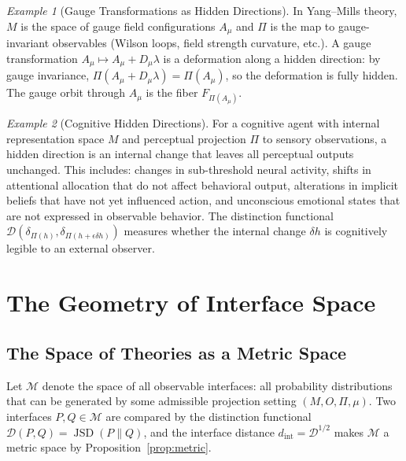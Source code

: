 \documentclass[12pt,a4paper]{article}
\theoremstyle{remark}
\newtheorem{example}{Example}[section]
\theoremstyle{definition}
\begin{document}
\begin{example}[Gauge Transformations as Hidden Directions]
In Yang--Mills theory, $M$ is the space of gauge field configurations
$A_\mu$ and $\Pi$ is the map to gauge-invariant observables (Wilson loops,
field strength curvature, etc.). A gauge transformation $A_\mu \mapsto
A_\mu + D_\mu\lambda$ is a deformation along a hidden direction: by gauge
invariance, $\Pi(A_\mu + D_\mu\lambda) = \Pi(A_\mu)$, so the deformation
is fully hidden. The gauge orbit through $A_\mu$ is the fiber $F_{\Pi(A_\mu)}$.
\end{example}

\begin{example}[Cognitive Hidden Directions]
\label{ex:cognitive}
For a cognitive agent with internal representation space $M$ and
perceptual projection $\Pi$ to sensory observations, a hidden direction
is an internal change that leaves all perceptual outputs unchanged. This
includes: changes in sub-threshold neural activity, shifts in attentional
allocation that do not affect behavioral output, alterations in implicit
beliefs that have not yet influenced action, and unconscious emotional
states that are not expressed in observable behavior. The distinction
functional $\mathcal{D}(\delta_{\Pi(h)}, \delta_{\Pi(h+\epsilon\delta h)})$ measures
whether the internal change $\delta h$ is cognitively legible to an
external observer.
\end{example}


\section{The Geometry of Interface Space}
\label{sec:geometry}

\subsection{The Space of Theories as a Metric Space}

Let $\mathcal{M}$ denote the space of all observable interfaces: all
probability distributions that can be generated by some admissible
projection setting $(M, O, \Pi, \mu)$. Two interfaces $P, Q \in \mathcal{M}$
are compared by the distinction functional $\mathcal{D}(P,Q) =
\operatorname{JSD}(P\|Q)$, and the interface distance $d_{\mathrm{int}} =
\mathcal{D}^{1/2}$ makes $\mathcal{M}$ a metric space by
Proposition~\ref{prop:metric}.
\end{document}
